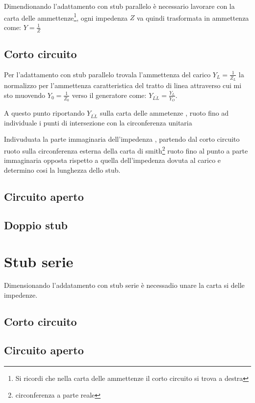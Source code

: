 \documentclass[10pt,a4paper]{report}
\begin{document}
		Dimendionando l'adattamento con stub parallelo è necessario lavorare con la carta delle ammettenze\footnote{Si ricordi che nella carta delle ammettenze il corto circuito si trova a destra}, ogni impedenza $Z$ va quindi trasformata in ammettenza come: $Y=\frac{1}{Z}$

		\subsection{Corto circuito}
				

			Per l'adattamento con stub parallelo trovala l'ammettenza del carico $Y_L=\frac{1}{Z_L}$ la normalizzo per l'ammettenza caratteristica del tratto di linea attraverso cui mi sto muovendo  $Y_0=\frac{1}{Z_0}$ verso il generatore come: $Y_{\overline{LL}}=\frac{Y_L}{Y_O}$.

			A questo punto riportando $Y_{\overline{LL}}$ sulla carta delle ammetenze , ruoto fino ad individuale i punti di intersezione con la circonferenza unitaria

			Indivuduata la parte immaginaria dell'impedenza , partendo dal corto circuito ruoto sulla circonferenza esterna della carta di smith\footnote{circonferenza a parte reale} ruoto fino al punto a parte immaginaria opposta rispetto a quella dell'impedenza dovuta al carico e determino cosi la lunghezza dello stub.

		\subsection{Circuito aperto}

		\subsection{Doppio stub}
	
	\section{Stub serie}

	 	Dimensionando l'addatamento con stub serie è necessadio unare la carta si delle impedenze.

		\subsection{Corto circuito}


		\subsection{Circuito aperto}
\end{document}
